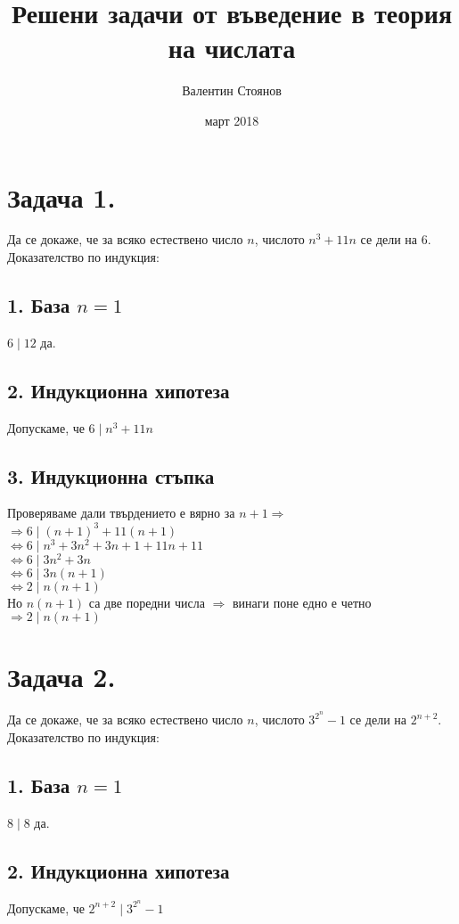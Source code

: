 \documentclass[10pt]{article}
\begin{document}
\title{Решени задачи от въведение в теория на числата}
\author{Валентин Стоянов}
\date{март 2018}
\maketitle

\section*{Задача 1.}
Да се докаже, че за всяко естествено число $n$, числото $n^3 + 11n$ се дели на 6.\\
Доказателство по индукция:\\
\subsection*{1. База $n = 1$}
$6 \mid 12$ да.
\subsection*{2. Индукционна хипотеза}
Допускаме, че $6 \mid n^3 + 11n$
\subsection*{3. Индукционна стъпка}
Проверяваме дали твърдението е вярно за $n+1 \Rightarrow$\\
$\Rightarrow 6 \mid (n+1)^3 + 11(n+1)$\\
$\Leftrightarrow 6 \mid n^3 +3n^2 + 3n + 1 + 11n + 11$\\
$\Leftrightarrow 6 \mid 3n^2 + 3n$\\
$\Leftrightarrow 6 \mid 3n(n + 1)$\\
$\Leftrightarrow 2 \mid n(n + 1)$\\
Но $n(n + 1)$ са две поредни числа $\Rightarrow$ винаги поне едно е четно
$\Rightarrow 2 \mid n(n + 1)$

\section*{Задача 2.}
Да се докаже, че за всяко естествено число $n$, числото $3^{2^n} - 1$ се дели на $2^{n + 2}$.\\
Доказателство по индукция:\\
\subsection*{1. База $n = 1$}
$8 \mid 8$ да.
\subsection*{2. Индукционна хипотеза}
Допускаме, че $2^{n + 2} \mid 3^{2^n} - 1$
\end{document}
